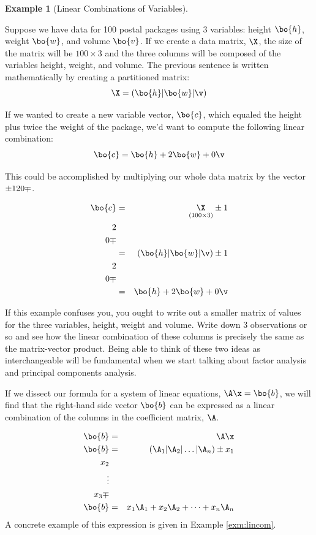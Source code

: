 \documentclass[
]{article}
\theoremstyle{definition}
\theoremstyle{definition}
\newtheorem{example}{Example}[section]
\theoremstyle{definition}
\theoremstyle{definition}
\theoremstyle{remark}
\begin{document}
\begin{example}[Linear Combinations of Variables]
\protect\hypertarget{exm:lincombvar}{}\label{exm:lincombvar}

Suppose we have data for 100 postal packages using 3 variables: height \(\bo{h}\), weight \(\bo{w}\), and volume \(\bo{v}\). If we create a data matrix, \(\X\), the size of the matrix will be \(100\times 3\) and the three columns will be composed of the variables height, weight, and volume. The previous sentence is written mathematically by creating a partitioned matrix:
\[\X = \left( \bo{h} | \bo{w} | \v \right)\]

If we wanted to create a new variable vector, \(\bo{c}\), which equaled the height plus twice the weight of the package, we'd want to compute the following linear combination:
\[\bo{c} = \bo{h} + 2\bo{w} + 0\v\]

This could be accomplished by multiplying our whole data matrix by the vector \(\pm 1\\2\\0\mp\).

\begin{eqnarray*}
\bo{c}&=&\underset{(100\times 3)}{\X}\pm 1\\2\\0\mp \cr
&=&\left( \bo{h} | \bo{w} | \v \right)\pm 1\\2\\0\mp \cr
&=& \bo{h} + 2\bo{w} + 0\v
\end{eqnarray*}

If this example confuses you, you ought to write out a smaller matrix of values for the three variables, height, weight and volume. Write down 3 observations or so and see how the linear combination of these columns is precisely the same as the matrix-vector product. Being able to think of these two ideas as interchangeable will be fundamental when we start talking about factor analysis and principal components analysis.

\end{example}

If we dissect our formula for a system of linear equations, \(\A\x=\bo{b}\), we will find that the right-hand side vector \(\bo{b}\) can be expressed as a linear combination of the columns in the coefficient matrix, \(\A\).

\begin{eqnarray*}
\bo{b}&=& \A\x\\
\bo{b}&=& (\A_1|\A_2|\dots|\A_n)\pm x_1\\x_2\\ \vdots\\x_3 \mp  \\
\bo{b}&=& x_1\A_1 + x_2\A_2 + \dots + x_n\A_n 
\end{eqnarray*}
A concrete example of this expression is given in Example \ref{exm:lincom}.
\end{document}
